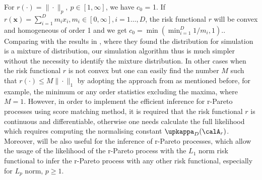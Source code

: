 \documentclass[12pt]{article}
\begin{document}
For $r(\cdot)=\|\cdot\|_p,\ p\in [1,\infty]$, we have $c_0$ = 1. If $r(\bm x)=\sum_{i=1}^D m_ix_i, m_i\in [0,\infty],i=1\dots,D$, the risk functional $r$ will be convex and homogeneous of order 1 and we get $c_0=\min(\min_{i=1}^D 1/m_i,1).$. Comparing with the results in \citet[Proposition 1]{Dombry.etal:2024}, where they found the distribution for simulation is a mixture of distribution, our simulation algorithm thus is much simpler without the necessity to identify the mixture distribution. In other cases when the risk functional $r$ is not convex but one can easily find the number $M$ such that $r (\cdot)\leq M\|\cdot\|_1$ by adopting the approach from \citet{Dombry.etal:2024} as mentioned before, for example, the minimum or any order statistics excluding the maxima, where $M=1$. However, in order to implement the efficient inference for r-Pareto processes using score matching method, it is required that the risk functional $r$ is continuous and differentiable, otherwise one needs calculate the full likelihood which requires computing the normalising constant $\upkappa_D(\calA_r)$. Moreover, \citet[Proposition 2]{Dombry.etal:2024} will be also useful for the inference of r-Pareto processes, which allow the usage of the likelihood of the r-Pareto process with the $L_1$ norm risk functional to infer the r-Pareto process with any other risk functional, especially for $L_p$ norm, $p\geq 1$.
\end{document}
